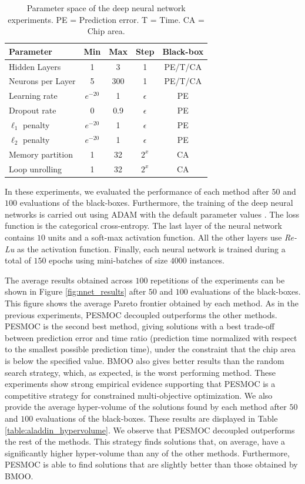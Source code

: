 \begin{table}[htb]
\centering
\caption{Parameter space of the deep neural network experiments. PE = Prediction error. T = Time. CA = Chip area.}
\begin{tabular}{lcccc}
 \hline
\textbf{Parameter} & \textbf{Min} & \textbf{Max} & \textbf{Step} & \textbf{Black-box} \\
 \hline
Hidden Layers & 1& 3& 1& PE/T/CA\\
Neurons per Layer & 5& 300& 1& PE/T/CA\\
Learning rate & $e^{-20}$& 1& $\epsilon$ & PE\\
Dropout rate & 0& 0.9& $\epsilon$ & PE\\
$\ell_1$ penalty & $e^{-20}$& 1& $\epsilon$ & PE\\
$\ell_2$ penalty & $e^{-20}$& 1& $\epsilon$ & PE\\
\hline
Memory partition & 1& 32& $2^{x}$& CA\\
Loop unrolling & 1& 32& $2^{x}$& CA\\
\hline
\end{tabular}
\label{table:aladdin}
\end{table}

In these experiments, we evaluated the performance of each method after $50$ and $100$ evaluations of the black-boxes.
Furthermore, the training of the deep neural networks is carried out using ADAM with the default parameter values
\citep{kingma2014adam}. The loss function is the categorical cross-entropy. The last layer of the
neural network contains $10$ units and a soft-max activation function. All the other layers use
\textit{Re-Lu} as the activation function. Finally, each neural network is trained during a total of
$150$ epochs using mini-batches of size $4000$ instances.

The average results obtained across $100$ repetitions of the experiments can be shown in
Figure \ref{fig:nnet_results} after $50$ and $100$ evaluations of the black-boxes. This
figure shows the average Pareto frontier obtained by each method. As in the previous experiments,
PESMOC decoupled outperforms the other methods. PESMOC is the second best method, giving
solutions with a best trade-off between prediction error and time ratio (prediction time normalized with respect
to the smallest possible prediction time), under the constraint that the chip area
is below the specified value. BMOO also gives better results than the random search strategy, which, as expected, 
is the worst performing method. These experiments show strong empirical evidence supporting
that PESMOC is a competitive strategy for constrained multi-objective optimization.
We also provide the average hyper-volume of the solutions found by each method after $50$ and $100$ evaluations
of the black-boxes. These results are displayed in Table \ref{table:aladdin_hypervolume}. We observe that PESMOC
decoupled outperforms the rest of the methods. This strategy finds solutions that, on average, have
a significantly higher hyper-volume than any of the other methods. Furthermore, PESMOC is
able to find solutions that are slightly better than those obtained by BMOO.

